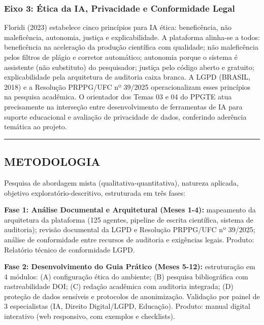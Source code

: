 \documentclass[
  brazilian,
  12pt,
]{article}
\begin{document}
\subsubsection{Eixo 3: Ética da IA, Privacidade e Conformidade
Legal}\label{eixo-3-uxe9tica-da-ia-privacidade-e-conformidade-legal}

Floridi (2023) estabelece cinco princípios para IA ética: beneficência,
não maleficência, autonomia, justiça e explicabilidade. A plataforma
alinha-se a todos: beneficência na aceleração da produção científica com
qualidade; não maleficência pelos filtros de plágio e corretor
automático; autonomia porque o sistema é assistente (não substituto) do
pesquisador; justiça pelo código aberto e gratuito; explicabilidade pela
arquitetura de auditoria caixa branca. A LGPD (BRASIL, 2018) e a
Resolução PRPPG/UFC nº 39/2025 operacionalizam esses princípios na
pesquisa acadêmica. O orientador dos Temas 03 e 04 do PPGTE atua
precisamente na interseção entre desenvolvimento de ferramentas de IA
para suporte educacional e avaliação de privacidade de dados, conferindo
aderência temática ao projeto.

\begin{center}\rule{0.5\linewidth}{0.5pt}\end{center}

\subsection{METODOLOGIA}\label{metodologia}

Pesquisa de abordagem mista (qualitativa-quantitativa), natureza
aplicada, objetivo exploratório-descritivo, estruturada em três fases:

\textbf{Fase 1: Análise Documental e Arquitetural (Meses 1-4):}
mapeamento da arquitetura da plataforma (125 agentes, pipeline de
escrita científica, sistema de auditoria); revisão documental da LGPD e
Resolução PRPPG/UFC nº 39/2025; análise de conformidade entre recursos
de auditoria e exigências legais. Produto: Relatório técnico de
conformidade LGPD.

\textbf{Fase 2: Desenvolvimento do Guia Prático (Meses 5-12):}
estruturação em 4 módulos: (A) configuração ética do ambiente; (B)
pesquisa bibliográfica com rastreabilidade DOI; (C) redação acadêmica
com auditoria integrada; (D) proteção de dados sensíveis e protocolos de
anonimização. Validação por painel de 3 especialistas (IA, Direito
Digital/LGPD, Educação). Produto: manual digital interativo (web
responsivo, com exemplos e checklists).
\end{document}

